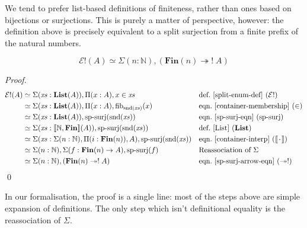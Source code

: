 We tend to prefer list-based definitions of finiteness, rather than ones based
on bijections or surjections.
This is purely a matter of perspective, however: the definition above is
precisely equivalent to a split surjection from a finite prefix of the natural
numbers.
\begin{romlemma} \label{split-enum-is-split-surj}
  \begin{equation}
    \mathcal{E}!(A) \simeq \Sigma (n : \mathbb{N}) , \left( \mathbf{Fin}(n) \twoheadrightarrow ! \; A \right)
  \end{equation}
\end{romlemma}
\begin{proof}
  \begin{align*}
    \mathcal{E}!(A)
    & \simeq \Sigma (\mathit{xs} : \textbf{List}(A)) , \Pi {(x : A)} , x \in \mathit{xs}
    && \text{def.~\ref{split-enum-def} }(\mathcal{E}!)
    \\
    & \simeq \Sigma (\mathit{xs} : \textbf{List}(A)) , \Pi {(x : A)} , \text{fib}_{\text{snd}(\mathit{xs})}(x)
    && \text{eqn.~\ref{container-membership} } (\in)
    \\
    & \simeq \Sigma (\mathit{xs} : \textbf{List}(A)) , \text{sp-surj}(\text{snd}(\mathit{xs}))
    && \text{eqn.~\ref{sp-surj-eqn} (sp-surj)}
    \\
    & \simeq \Sigma (\mathit{xs} : \llbracket \mathbb{N} , \mathbf{Fin} \rrbracket (A)) , \text{sp-surj}(\text{snd}(\mathit{xs}))
    && \text{def.~\ref{List} } (\mathbf{List})
    \\
    & \simeq \Sigma (\mathit{xs} : \Sigma (n : \mathbb{N}) , \Pi (i : \mathbf{Fin}(n)) , A) , \text{sp-surj}(\text{snd}(\mathit{xs}))
    && \text{eqn.~\ref{container-interp} } (\llbracket {\mkern 2mu\cdot\mkern 2mu} \rrbracket)
    \\
    & \simeq \Sigma (n : \mathbb{N}) , \Sigma (f : \mathbf{Fin}(n) \rightarrow A) , \text{sp-surj}(f)
    && \text{Reassociation of } \Sigma
    \\
    & \simeq \Sigma (n : \mathbb{N}) , ( \mathbf{Fin}(n) \twoheadrightarrow ! \; A )
    && \text{eqn.~\ref{sp-surj-arrow-eqn} } (\twoheadrightarrow!)
  \end{align*}
  \qed
\end{proof}

In our formalisation, the proof is a single line: most of the steps above are
simple expansion of definitions.
The only step which isn't definitional equality is the reassociation of
\(\Sigma\).

